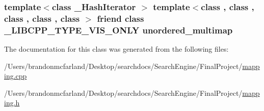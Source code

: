 \subsubsection[{unordered\+\_\+multimap}]{\setlength{\rightskip}{0pt plus 5cm}template$<$class \+\_\+\+Hash\+Iterator $>$ template$<$class , class , class , class , class $>$ friend class \+\_\+\+L\+I\+B\+C\+P\+P\+\_\+\+T\+Y\+P\+E\+\_\+\+V\+I\+S\+\_\+\+O\+N\+L\+Y {\bf unordered\+\_\+multimap}\hspace{0.3cm}{\ttfamily [friend]}}\label{class____hash__map__const__iterator_a10e575a91277f87c87f667fc1d2672eb}


The documentation for this class was generated from the following files\+:\begin{DoxyCompactItemize}
\item 
/\+Users/brandonmcfarland/\+Desktop/searchdocs/\+Search\+Engine/\+Final\+Project/\hyperlink{mapping_8cpp}{mapping.\+cpp}\item 
/\+Users/brandonmcfarland/\+Desktop/searchdocs/\+Search\+Engine/\+Final\+Project/\hyperlink{mapping_8h}{mapping.\+h}\end{DoxyCompactItemize}
